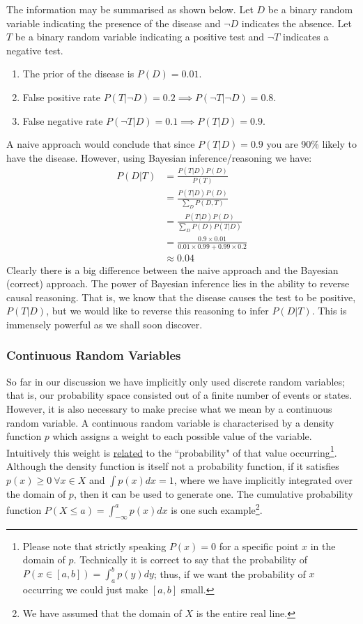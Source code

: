 \documentclass[../masters.tex]{subfiles}
\begin{document}
The information may be summarised as shown below. Let $D$ be a binary random variable indicating the presence of the disease and $\neg D$ indicates the absence. Let $T$ be a binary random variable indicating a positive test and $\neg T$ indicates a negative test. 
\begin{enumerate}
\item
The prior of the disease is $P(D) = 0.01$.
\item
False positive rate $P(T|\neg D) = 0.2 \implies P(\neg T|\neg D) = 0.8$.
\item
False negative rate $P(\neg T|D) = 0.1 \implies P(T|D) = 0.9$.
\end{enumerate}
A naive approach would conclude that since $P(T|D) = 0.9$ you are 90\% likely to have the disease. However, using Bayesian inference/reasoning we have: 
\begin{equation*}
\begin{aligned}
P(D|T) &= \frac{P(T|D)P(D)}{P(T)} \\
&=  \frac{P(T|D)P(D)}{\sum_D P(D,T)} \\
&= \frac{P(T|D)P(D)}{\sum_D P(D)P(T|D)} \\
& = \frac{0.9 \times 0.01}{0.01 \times 0.99 + 0.99 \times 0.2} \\
&\approx 0.04
\end{aligned}
\end{equation*}
Clearly there is a big difference between the naive approach and the Bayesian (correct) approach. The power of Bayesian inference lies in the ability to reverse causal reasoning. That is, we know that the disease causes the test to be positive, $P(T|D)$, but we would like to reverse this reasoning to infer $P(D|T)$. This is immensely powerful as we shall soon discover.   

\subsubsection{Continuous Random Variables}

So far in our discussion we have implicitly only used discrete random variables; that is, our probability space consisted out of a finite number of events or states. However, it is also necessary to make precise what we mean by a continuous random variable. A continuous random variable is characterised by a density function $p$ which assigns a weight to each possible value of the variable. Intuitively this weight is \underline{related} to the ``probability" of that value occurring\footnote{Please note that strictly speaking $P(x)=0$ for a specific point $x$ in the domain of $p$. Technically it is correct to say that the probability of $P(x \in [a,b]) = \int_a^b p(y)dy$; thus, if we want the probability of $x$ occurring we could just make $[a,b]$ small.}. Although the density function is itself not a probability function, if it satisfies $p(x) \geq 0~\forall x \in X$ and $\int p(x)dx = 1$, where we have implicitly integrated over the domain of $p$, then it can be used to generate one. The cumulative probability function $P(X \leq a)=\int^a_{-\infty} p(x)dx$ is one such example\footnote{We have assumed that the domain of $X$ is the entire real line.}. 
\end{document}
